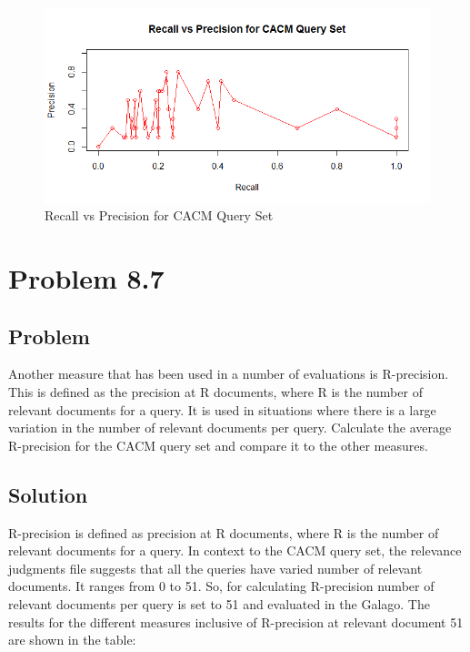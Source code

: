 \documentclass[12pt]{report}
\begin{document}
\begin{figure}[ht]
  \centering
  \includegraphics[width=1\textwidth]{Problem8_5/RecallvsPrecision.png}
  \caption{Recall vs Precision for CACM Query Set}
  \label{fig:1}
\end{figure}

\chapter{Problem 8.7}
\section{Problem}
Another measure that has been used in a number of evaluations is R-precision. This is defined as the precision at R documents, where R is the number of relevant documents for a query. It is used in situations where there is a large variation in the number of relevant documents per query. Calculate the average R-precision for the CACM query set and compare it to the other measures.
\section{Solution}
R-precision is defined as precision at R documents, where R is the number of relevant documents for a query. In context to the CACM query set, the relevance judgments file suggests that all the queries have varied number of relevant documents. It ranges from 0 to 51. So, for calculating R-precision number of relevant documents per query is set to 51 and evaluated in the Galago.
The results for the different measures inclusive of R-precision at relevant document 51 are shown in the table:
\end{document}
